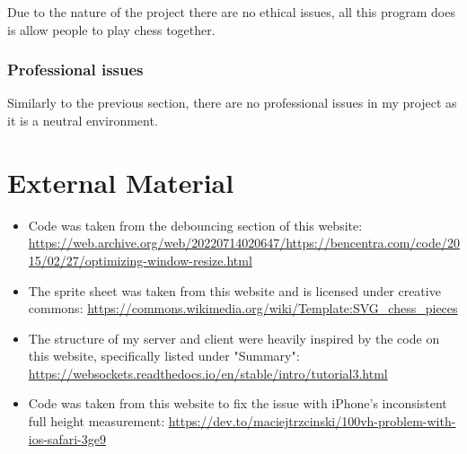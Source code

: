 \begin{appendices}
Due to the nature of the project there are no ethical issues, all this program does is allow people to play chess together.

\subsection{Professional issues}

Similarly to the previous section, there are no professional issues in my project as it is a neutral environment.

\chapter{External Material}

\begin{itemize}
\item Code was taken from the debouncing section of this website: \url{https://web.archive.org/web/20220714020647/https://bencentra.com/code/2015/02/27/optimizing-window-resize.html}

\item The sprite sheet was taken from this website and is licensed under creative commons: \url{https://commons.wikimedia.org/wiki/Template:SVG_chess_pieces}

\item The structure of my server and client were heavily inspired by the code on this website, specifically listed under "Summary": \url{https://websockets.readthedocs.io/en/stable/intro/tutorial3.html}

\item Code was taken from this website to fix the issue with iPhone's inconsistent full height measurement: \url{https://dev.to/maciejtrzcinski/100vh-problem-with-ios-safari-3ge9}
\end{itemize}

\end{appendices}
